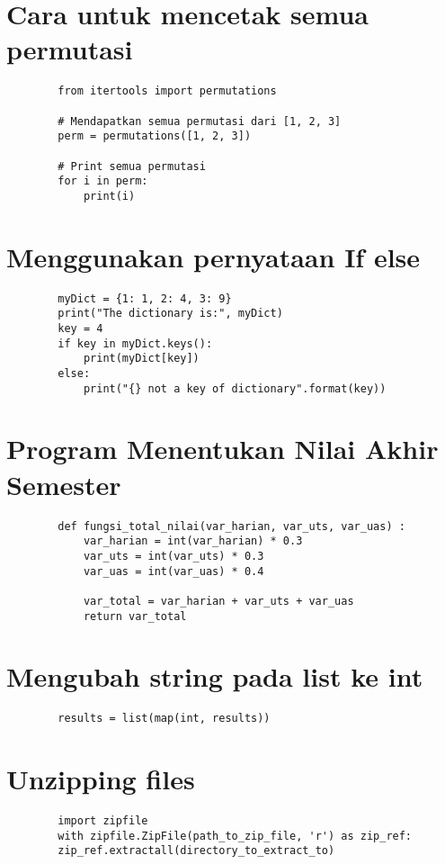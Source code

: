 \documentclass{article}
\begin{document}
	\section {Cara untuk mencetak semua permutasi}
	\begin{lstlisting}
		from itertools import permutations
		
		# Mendapatkan semua permutasi dari [1, 2, 3]
		perm = permutations([1, 2, 3])
		
		# Print semua permutasi
		for i in perm:
			print(i)
	\end{lstlisting}
	
	\section {Menggunakan pernyataan If else}
	\begin{lstlisting}
		myDict = {1: 1, 2: 4, 3: 9}
		print("The dictionary is:", myDict)
		key = 4
		if key in myDict.keys():
			print(myDict[key])
		else:
			print("{} not a key of dictionary".format(key))
	\end{lstlisting}
	
	\section {Program Menentukan Nilai Akhir Semester}
	\begin{lstlisting}
		def fungsi_total_nilai(var_harian, var_uts, var_uas) :
			var_harian = int(var_harian) * 0.3
			var_uts = int(var_uts) * 0.3
			var_uas = int(var_uas) * 0.4
			
			var_total = var_harian + var_uts + var_uas
			return var_total
	\end{lstlisting}

	\section {Mengubah string pada list ke int}
	\begin{lstlisting}
		results = list(map(int, results))
	\end{lstlisting}

	\section {Unzipping files}
	\begin{lstlisting}
		import zipfile
		with zipfile.ZipFile(path_to_zip_file, 'r') as zip_ref:
		zip_ref.extractall(directory_to_extract_to)
	\end{lstlisting}
\end{document}
